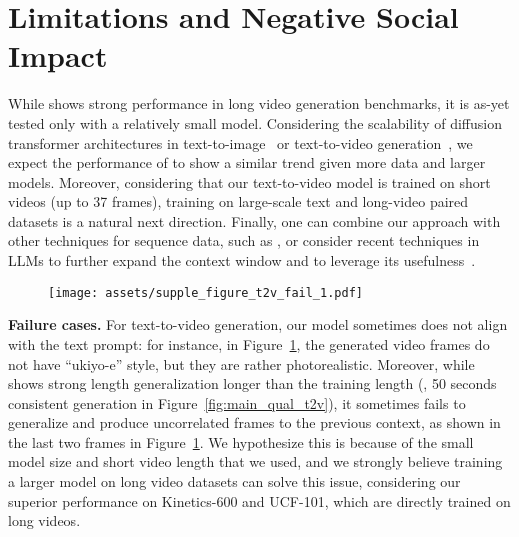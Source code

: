 \section{Limitations and Negative Social Impact}
\label{appen:social_impact}


While \sname shows strong performance in long video generation benchmarks, it is as-yet tested only with a relatively small model.
Considering the scalability of diffusion transformer architectures in text-to-image~\citep{chen2023pixart} or text-to-video generation~\citep{gupta2023photorealistic}, we expect the performance of \sname to show a similar trend given more data and larger models.
Moreover, considering that our text-to-video model is trained on short videos (up to 37 frames), training \sname on large-scale text and long-video paired datasets is a natural next direction.
Finally, one can combine our approach with other techniques for sequence data, such as \citet{ruhe2024rolling}, or consider recent techniques in LLMs to further expand the context window and to leverage its usefulness~\citep{liu2023ring}.

\begin{figure}[ht!]
    \centering    
    \texttt{[image: assets/supple\_figure\_t2v\_fail\_1.pdf]}
\label{fig:t2v_failure}
\end{figure}
\vspace{0.02in}
\noindent\textbf{Failure cases.}
For text-to-video generation, our model sometimes does not align with the text prompt: for instance, in Figure~\ref{fig:t2v_failure}, the generated video frames do not have ``ukiyo-e'' style, but they are rather photorealistic. Moreover, while \sname shows strong length generalization longer than the training length (\eg, 50 seconds consistent generation in Figure~\ref{fig:main_qual_t2v}), it sometimes fails to generalize and produce uncorrelated frames to the previous context, as shown in the last two frames in Figure~\ref{fig:t2v_failure}. We hypothesize this is because of the small model size and short video length that we used, and we strongly believe training a larger model on long video datasets can solve this issue, considering our superior performance on Kinetics-600 and UCF-101, which are directly trained on long videos.

